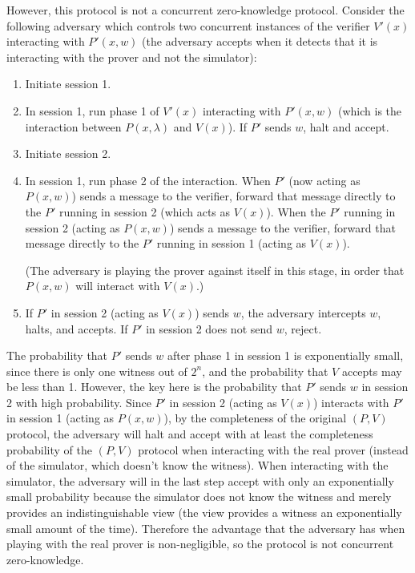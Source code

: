 \documentclass[draft]{article}
\begin{document}
\begin{enumerate}
  However, this protocol is not a concurrent zero-knowledge protocol.
  Consider the following adversary which controls two concurrent instances of the verifier $V'(x)$ interacting with $P'(x, w)$ (the adversary accepts when it detects that it is interacting with the prover and not the simulator):
  \begin{enumerate}
  \item Initiate session 1.
  \item
    In session 1, run phase 1 of  $V'(x)$ interacting with $P'(x, w)$ (which is the interaction between $P(x, \lambda)$ and $V(x)$).
    If $P'$ sends $w$, halt and accept.
  \item Initiate session 2.
  \item 
    In session 1, run phase 2 of the interaction.
    When $P'$ (now acting as $P(x, w)$) sends a message to the verifier, forward that message directly to the $P'$ running in session 2 (which acts as $V(x)$).
    When the $P'$ running in session 2 (acting as $P(x, w)$) sends a message to the verifier, forward that message directly to the $P'$ running in session 1 (acting as $V(x)$).

    (The adversary is playing the prover against itself in this stage, in order that $P(x, w)$ will interact with $V(x)$.)
  \item
    If $P'$ in session 2 (acting as $V(x)$) sends $w$, the adversary intercepts $w$, halts, and accepts.
    If $P'$ in session 2 does not send $w$, reject.
  \end{enumerate}

  The probability that $P'$ sends $w$ after phase 1 in session 1 is exponentially small, since there is only one witness out of $2^n$, and the probability that $V$ accepts may be less than 1.
  However, the key here is the probability that $P'$ sends $w$ in session 2 with high probability.
  Since $P'$ in session 2 (acting as $V(x)$) interacts with $P'$ in session 1 (acting as $P(x, w)$), by the completeness of the original $(P, V)$ protocol, the adversary will halt and accept with at least the completeness probability of the $(P, V)$ protocol when interacting with the real prover (instead of the simulator, which doesn't know the witness).
  When interacting with the simulator, the adversary will in the last step accept with only an exponentially small probability because the simulator does not know the witness and merely provides an indistinguishable view (the view provides a witness an exponentially small amount of the time).
  Therefore the advantage that the adversary has when playing with the real prover is non-negligible, so the protocol is not concurrent zero-knowledge.
\end{enumerate}
\end{document}
